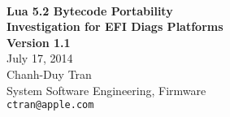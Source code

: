 
\begin{titlepage}

\setlength{\parindent}{0in}

{
	\fontsize{32}{32}\selectfont
	\textcolor{AppleGray}{\AppleLogo}
}
\\[0.25in]

{
	\fontsize{32}{32}\selectfont
	\textcolor{SmokeyDarkBlue}{\bfseries Lua 5.2 Bytecode Portability} \\[0.3ex]
	\textbf{Investigation for EFI Diags Platforms}
}
\\[0.25in]

\textbf{Version 1.1} \\
July 17, 2014
\\[0.25in]

Chanh-Duy Tran \\
System Software Engineering, Firmware \\
\texttt{ctran@apple.com}

\vfill

\begin{center}
\end{center}

\end{titlepage}
